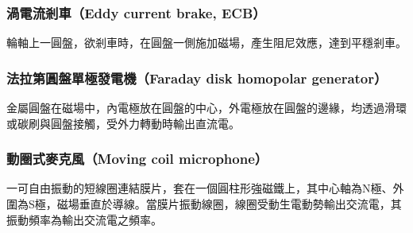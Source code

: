 \documentclass[a4paper,12pt]{report}
\begin{document}
\begin{itemize}
\subsubsection{渦電流剎車（Eddy current brake, ECB）}
輪軸上一圓盤，欲剎車時，在圓盤一側施加磁場，產生阻尼效應，達到平穩剎車。
\subsubsection{法拉第圓盤單極發電機（Faraday disk homopolar generator）}
金屬圓盤在磁場中，內電極放在圓盤的中心，外電極放在圓盤的邊緣，均透過滑環或碳刷與圓盤接觸，受外力轉動時輸出直流電。
\subsubsection{動圈式麥克風（Moving coil microphone）}
一可自由振動的短線圈連結膜片，套在一個圓柱形強磁鐵上，其中心軸為N極、外圍為S極，磁場垂直於導線。當膜片振動線圈，線圈受動生電動勢輸出交流電，其振動頻率為輸出交流電之頻率。

\end{itemize}
\end{document}
